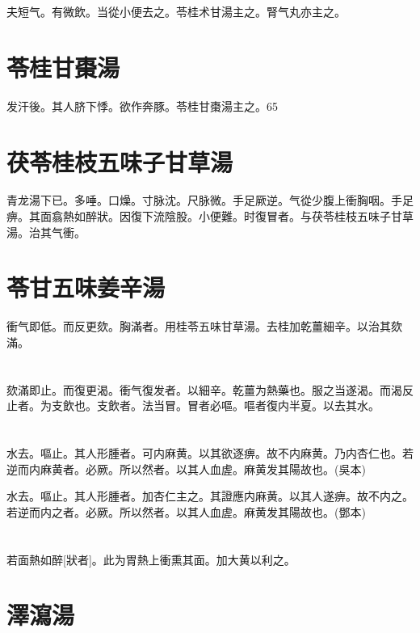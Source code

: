 \documentclass[12pt,twoside,UTF8,b5paper]{ctexbook}
\begin{document}
夫短气。有微飲。当從小便去之。苓桂术甘湯主之。腎气丸亦主之。

\section{苓桂甘棗湯}

发汗後。其人脐下悸。欲作奔豚。苓桂甘棗湯主之。65

\section{茯苓桂枝五味子甘草湯}

青龙湯下已。多唾。口燥。寸脉沈。尺脉微。手足厥逆。气從少腹上衝胸咽。手足痹。其面翕熱如醉狀。因復下流陰股。小便難。时復冒者。与茯苓桂枝五味子甘草湯。治其气衝。

\section{苓甘五味姜辛湯}

衝气即低。而反更欬。胸滿者。用桂苓五味甘草湯。去桂加乾薑細辛。以治其欬滿。

\section{}

欬滿即止。而復更渴。衝气復发者。以細辛。乾薑为熱藥也。服之当遂渴。而渴反止者。为支飲也。支飲者。法当冒。冒者必嘔。嘔者復内半夏。以去其水。

\section{}

水去。嘔止。其人形腫者。可内麻黄。以其欲逐痹。故不内麻黄。乃内杏仁也。若逆而内麻黄者。必厥。所以然者。以其人血虗。麻黄发其陽故也。(吳本)

水去。嘔止。其人形腫者。加杏仁主之。其證應内麻黄。以其人遂痹。故不内之。若逆而内之者。必厥。所以然者。以其人血虗。麻黄发其陽故也。(鄧本)

\section{}

若面熱如醉[狀者]。此为胃熱上衝熏其面。加大黄以利之。

\section{澤瀉湯}
\end{document}
